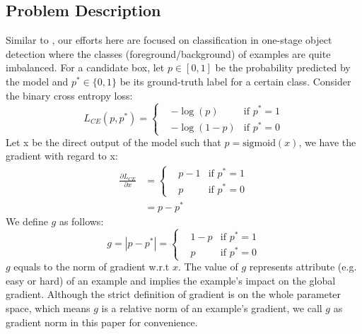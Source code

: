\documentclass[letterpaper]{article} \usepackage{aaai19}  \usepackage{times}  \usepackage{helvet}  \usepackage{courier}  \usepackage{url}  \usepackage{graphicx}  \usepackage{amsmath,amssymb}
\begin{document}
\subsection{Problem Description}
Similar to \cite{focal}, our efforts here are focused on classification in one-stage object detection where the classes (foreground/background) of examples are quite imbalanced. For a candidate box, let $p \in [0,1]$ be the probability predicted by the model and $p^* \in \{0,1\}$ be its ground-truth label for a certain class. Consider the binary cross entropy loss: 
\begin{equation}
\label{eq:ce}
  L_{CE}(p,p^*) = \left\{
    \begin{aligned}
    & -\log(p)  & \text{if } p^* = 1 \\
    & -\log(1-p) & \text{if } p^* = 0 
    \end{aligned}
  \right.
\end{equation}
Let x be the direct output of the model such that $p = \text{sigmoid}(x)$, we have the gradient with regard to x:
\begin{equation}
\begin{aligned}
\frac{\partial L_{CE}}{\partial x} &= \left\{
    \begin{aligned}
    & p - 1  & \text{if } p^* = 1 \\
    & p & \text{if } p^* = 0 
    \end{aligned} 
    \right. \\
    &= p - p^*
\end{aligned}
\end{equation}
We define $g$ as follows:
\begin{equation}
    g = |p - p^*| = \left\{
    \begin{aligned}
    & 1 - p  & \text{if } p^* = 1 \\
    & p & \text{if } p^* = 0 
    \end{aligned}
    \right.
\end{equation}
$g$ equals to the norm of gradient w.r.t $x$. The value of $g$ represents attribute (e.g. easy or hard) of an example and implies the example's impact on the global gradient. Although the strict definition of gradient is on the whole parameter space, which means $g$ is a relative norm of an example's gradient, we call $g$ as gradient norm in this paper for convenience.
\end{document}
